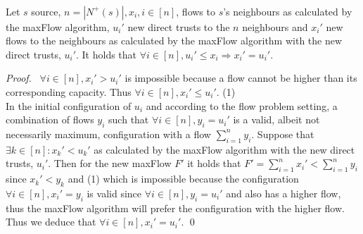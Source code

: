 \documentclass[11pt]{llncs}
\begin{document}
    \begin{theorem} \ \\  
       \label{saturation} 
       Let $s$ source, $n = |N^{+}(s)|, x_i, i \in [n]$, flows to $s$'s neighbours as calculated by the 
       maxFlow algorithm, $u_i'$ new direct trusts to the $n$ neighbours and $x_i'$ new flows to the neighbours 
       as calculated by the maxFlow algorithm with the new direct trusts, $u_i'$. It holds that 
       $\forall i \in [n], u_i' \leq x_i \Rightarrow x_i' = u_i'$. 
    \end{theorem} 
    \begin{proof} \  
       $\forall i \in [n], x_i' > u_i'$ is impossible because a flow cannot be higher than its 
       corresponding capacity. Thus $\forall i \in [n], x_i' \leq u_i'$. (1) \\ 
       In the initial configuration of $u_i$ and according to the flow problem setting, a combination of flows 
       $y_i$ such that $\forall i \in [n], y_i = u_i'$ is a valid, albeit not necessarily maximum, 
       configuration with a flow $\sum\limits_{i=1}^{n}y_i$. Suppose that $\exists k \in [n] : x_k' 
       < u_k'$ as calculated by the maxFlow algorithm with the new direct trusts, $u_i'$. Then for the new 
       maxFlow $F'$ it holds that $F' = \sum\limits_{i=1}^{n}x_i' < \sum\limits_{i=1}^{n}y_i$ since $x_k' < y_k$ 
       and (1) which is impossible because the configuration $\forall i \in [n], x_i' = y_i$ is valid since  
       $\forall i \in [n], y_i = u_i'$ and also has a higher flow, thus the maxFlow algorithm will 
       prefer the configuration with the higher flow. Thus we deduce that $\forall i \in [n], x_i' = u_i'$. \qed 
    \end{proof}
\end{document}
